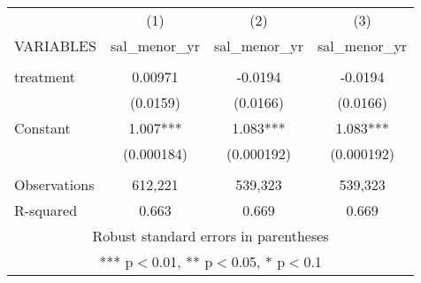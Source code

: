 \documentclass[]{article}
\begin{document}
\begin{tabular}{lccc} \hline
 & (1) & (2) & (3) \\
VARIABLES & sal\_menor\_yr & sal\_menor\_yr & sal\_menor\_yr \\ \hline
 &  &  &  \\
treatment & 0.00971 & -0.0194 & -0.0194 \\
 & (0.0159) & (0.0166) & (0.0166) \\
Constant & 1.007*** & 1.083*** & 1.083*** \\
 & (0.000184) & (0.000192) & (0.000192) \\
 &  &  &  \\
Observations & 612,221 & 539,323 & 539,323 \\
 R-squared & 0.663 & 0.669 & 0.669 \\ \hline
\multicolumn{4}{c}{ Robust standard errors in parentheses} \\
\multicolumn{4}{c}{ *** p$<$0.01, ** p$<$0.05, * p$<$0.1} \\
\end{tabular}
\end{document}
